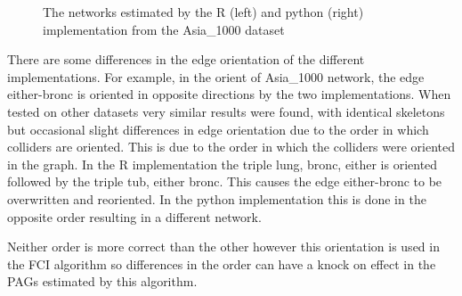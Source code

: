 \documentclass{UoYCSproject}
\begin{document}
\begin{figure}[h]
\begin{center}
\end{center}
\caption{The networks estimated by the R (left) and python (right) implementation from the Asia\_1000 dataset}
\end{figure}

There are some differences in the edge orientation of the different implementations. For example, in the orient of Asia\_1000 network, the edge either-bronc is oriented in opposite directions by the two implementations. When tested on other datasets very similar results were found, with identical skeletons but occasional slight differences in edge orientation due to the order in which colliders are oriented. This is due to the order in which the colliders were oriented in the graph. In the R implementation the triple lung, bronc, either is oriented followed by the triple tub, either bronc. This causes the edge either-bronc to be overwritten and reoriented. In the python implementation this is done in the opposite order resulting in a different network.

Neither order is more correct than the other however this orientation is used in the FCI algorithm so differences in the order can have a  knock on effect in the PAGs estimated by this algorithm.
\end{document}
